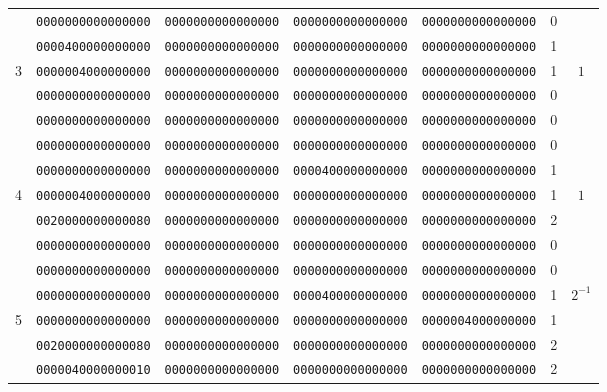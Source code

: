 \begin{table}[!tb]
\begin{center}
{\begin{tabular}{ccccccc}
      & {\tt 0000000000000000} & {\tt 0000000000000000} & {\tt 0000000000000000} & {\tt 0000000000000000} & 0  & \\
      & {\tt 0000400000000000} & {\tt 0000000000000000} & {\tt 0000000000000000} & {\tt 0000000000000000} & 1  & \\
3     & {\tt 0000004000000000} & {\tt 0000000000000000} & {\tt 0000000000000000} & {\tt 0000000000000000} & 1  & $1$\\
      & {\tt 0000000000000000} & {\tt 0000000000000000} & {\tt 0000000000000000} & {\tt 0000000000000000} & 0  & \\
      & {\tt 0000000000000000} & {\tt 0000000000000000} & {\tt 0000000000000000} & {\tt 0000000000000000} & 0  & \\ \hline

      & {\tt 0000000000000000} & {\tt 0000000000000000} & {\tt 0000000000000000} & {\tt 0000000000000000} & 0  & \\
      & {\tt 0000000000000000} & {\tt 0000000000000000} & {\tt 0000400000000000} & {\tt 0000000000000000} & 1  & \\
4     & {\tt 0000004000000000} & {\tt 0000000000000000} & {\tt 0000000000000000} & {\tt 0000000000000000} & 1  & $1$\\
      & {\tt 0020000000000080} & {\tt 0000000000000000} & {\tt 0000000000000000} & {\tt 0000000000000000} & 2  & \\
      & {\tt 0000000000000000} & {\tt 0000000000000000} & {\tt 0000000000000000} & {\tt 0000000000000000} & 0  & \\ \hline

      & {\tt 0000000000000000} & {\tt 0000000000000000} & {\tt 0000000000000000} & {\tt 0000000000000000} & 0  & \\
      & {\tt 0000000000000000} & {\tt 0000000000000000} & {\tt 0000400000000000} & {\tt 0000000000000000} & 1  & \multirow{3}{*}{$2^{-1}$}\\
5     & {\tt 0000000000000000} & {\tt 0000000000000000} & {\tt 0000000000000000} & {\tt 0000004000000000} & 1  & \\
      & {\tt 0020000000000080} & {\tt 0000000000000000} & {\tt 0000000000000000} & {\tt 0000000000000000} & 2  & \\
      & {\tt 0000040000000010} & {\tt 0000000000000000} & {\tt 0000000000000000} & {\tt 0000000000000000} & 2  & \\ \hline


\end{tabular}}
\end{center}
\end{table}
